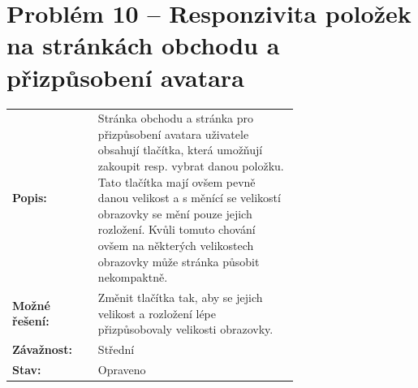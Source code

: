 \section*{Problém 10 – Responzivita položek na stránkách obchodu a přizpůsobení avatara}

\begin{tabular}{lp{0.7\linewidth}}
    \textbf{Popis:} & Stránka obchodu a stránka pro přizpůsobení avatara uživatele obsahují tlačítka, která umožňují zakoupit resp. vybrat danou položku. Tato tlačítka mají ovšem pevně danou velikost a s měnící se velikostí obrazovky se mění pouze jejich rozložení. Kvůli tomuto chování ovšem na některých velikostech obrazovky může stránka působit nekompaktně. \\
    \textbf{Možné řešení:} & Změnit tlačítka tak, aby se jejich velikost a rozložení lépe přizpůsobovaly velikosti obrazovky.  \\ 
    \textbf{Závažnost:} & Střední \\
    \textbf{Stav:} & Opraveno  \\
\end{tabular}
